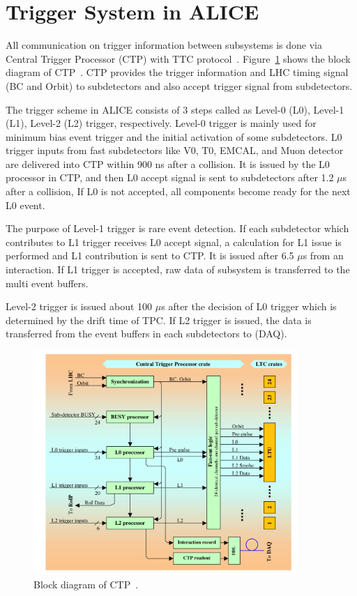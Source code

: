 \section{Trigger System in ALICE}
\label{sec_3_trigger}
All communication on trigger information between subsystems is done via Central Trigger Processor (CTP) with TTC protocol~\cite{bib_ctp,bib_ttc}.
Figure~\ref{fig_3_ctp} shows the block diagram of CTP~\cite{bib_ctp}. 
CTP provides the trigger information and LHC timing signal (BC and Orbit) to subdetectors and also accept trigger signal from subdetectors.  

The trigger scheme in ALICE consists of 3 steps called as Level-0 (L0), Level-1 (L1), Level-2 (L2) trigger, respectively.
Level-0 trigger is mainly used for minimum bias event trigger and the initial activation of some subdetectors. 
L0 trigger inputs from fast subdetectors like V0, T0, EMCAL, and Muon detector are delivered into CTP within 900 ns after a collision. 
It is issued by the L0 processor in CTP, and then L0 accept signal is sent to subdetectors after 1.2 $\mu$s after a collision, 
If L0 is not accepted, all components become ready for the next L0 event. 

The purpose of Level-1 trigger is rare event detection. 
If each subdetector which contributes to L1 trigger receives L0 accept signal, a calculation for L1 issue is performed and L1 contribution is sent to CTP.  
It is issued after 6.5 $\mu$s from an interaction.
If L1 trigger is accepted, raw data of subsystem is transferred to the multi event buffers. 

Level-2 trigger is issued about 100 $\mu$s after the decision of L0 trigger which is determined by the drift time of TPC. 
If L2 trigger is issued, the data is transferred from the event buffers in each subdetectors to (DAQ). 

\begin{figure}[!h]
  \centering
  \includegraphics[width=10cm]{chap3/figure/Trigger/CTP.png}
  \caption{Block diagram of CTP~\cite{bib_ctp}.}
  \label{fig_3_ctp}
\end{figure}

